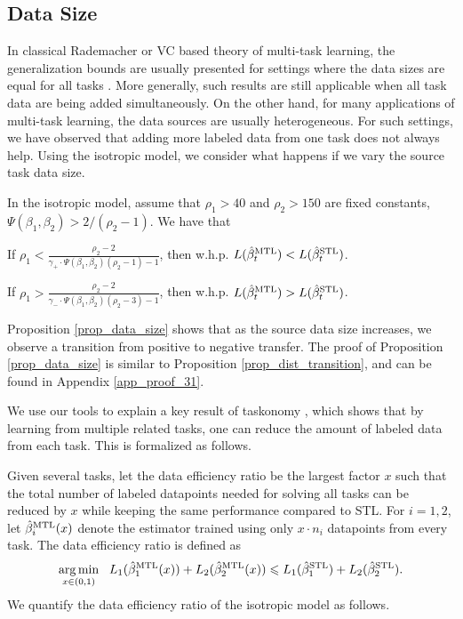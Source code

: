 \subsection{Data Size}
In classical Rademacher or VC based theory of multi-task learning, the generalization bounds are usually presented for settings where the data sizes are equal for all tasks \cite{B00,M06,MPR16}.
More generally, such results are still applicable when all task data are being added simultaneously.
On the other hand, for many applications of multi-task learning, the data sources are usually heterogeneous.
For such settings, we have observed that adding more labeled data from one task does not always help.
Using the isotropic model, we consider what happens if we vary the source task data size.

\begin{proposition}\label{prop_data_size}
	In the isotropic model, assume that $\rho_1 > 40$ and $\rho_2 > 150$ are fixed constants, $\Psi(\beta_1, \beta_2) > 2/(\rho_2 - 1)$.
	We have that
	\squishlist
		\item If $\rho_1 < \frac{\rho_2-2}{\gamma_+ \cdot \Psi(\beta_1, \beta_2) (\rho_2 - 1) - 1}$, then w.h.p. $L(\hat{\beta}_t^{\text{MTL}}) < L(\hat{\beta}_t^{\text{STL}})$.
		\item If $\rho_1 > \frac{\rho_2-2}{\gamma_- \cdot \Psi(\beta_1, \beta_2) (\rho_2 - 3) - 1}$, then w.h.p. $L(\hat{\beta}_t^{\text{MTL}}) > L(\hat{\beta}_t^{\text{STL}})$.
	\squishend
\end{proposition}
Proposition \ref{prop_data_size} shows that as the source data size increases, we observe a transition from positive to negative transfer.
The proof of Proposition \ref{prop_data_size} is similar to Proposition \ref{prop_dist_transition}, and can be found in Appendix \ref{app_proof_31}.


We use our tools to explain a key result of taskonomy \cite{ZSSGM18}, which shows that by learning from multiple related tasks, one can reduce the amount of labeled data from each task.
This is formalized as follows.

Given several tasks, let the data efficiency ratio be the largest factor $x$ such that the total number of labeled datapoints needed for solving all tasks can be reduced by $x$ while keeping the same performance compared to STL.
For $i = 1, 2$, let $\hat{\beta}_i^{\text{MTL}}(x)$ denote the estimator trained using only $x \cdot n_i$ datapoints from every task.
The data efficiency ratio is defined as
\[ \operatorname*{arg\,min}_{x\in(0, 1)} ~~
		L_1(\hat{\beta}_1^{\text{MTL}}(x)) + L_2(\hat{\beta}_2^{\text{MTL}}(x))
		\leqslant L_1(\hat{\beta}_1^{\text{STL}}) + L_2(\hat{\beta}_2^{\text{STL}}). \]
We quantify the data efficiency ratio of the isotropic model as follows.

